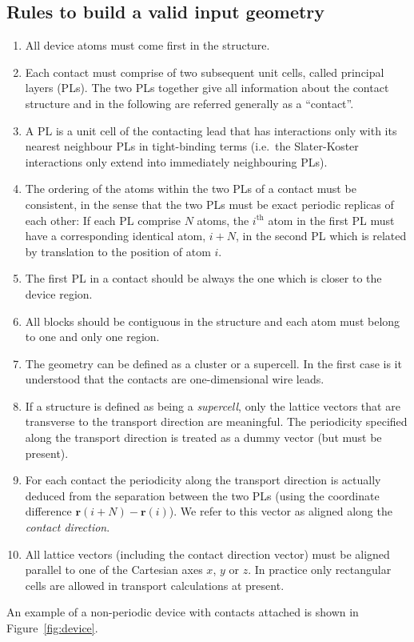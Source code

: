 \subsection{Rules to build a valid input geometry}
\begin{enumerate}
\item \label{rule1} All device atoms must come first in the structure.
\item \label{rule2} Each contact must comprise of two subsequent unit cells,
  called principal layers (PLs). The two PLs together give all information about
  the contact structure and in the following are referred generally as a
  ``contact''.
\item \label{rule3} A PL is a unit cell of the contacting lead that has
  interactions only with its nearest neighbour PLs in tight-binding terms
  (i.e.\ the Slater-Koster interactions only extend into immediately neighbouring
  PLs).
\item \label{rule4} The ordering of the atoms within the two PLs of a contact
  must be consistent, in the sense that the two PLs must be exact periodic
  replicas of each other: If each PL comprise $N$ atoms, the $i^\mathrm{th}$
  atom in the first PL must have a corresponding identical atom, $i+N$, in the
  second PL which is related by translation to the position of atom $i$.
\item \label{rule5} The first PL in a contact should be always the one which is
  closer to the device region.
\item \label{rule6} All blocks should be contiguous in the structure and each
  atom must belong to one and only one region.
\item \label{rule7} The geometry can be defined as a cluster or a supercell. In
  the first case is it understood that the contacts are one-dimensional wire
  leads.
\item \label{rule8} If a structure is defined as being a {\em supercell}, only
  the lattice vectors that are transverse to the transport direction are
  meaningful. The periodicity specified along the transport direction is treated
  as a dummy vector (but must be present).
\item \label{rule9} For each contact the periodicity along the transport
  direction is actually deduced from the separation between the two PLs (using
  the coordinate difference $\mathbf{r}(i+N)-\mathbf{r}(i)$). We refer to this
  vector as aligned along the {\em contact direction}.
\item \label{rule10} All lattice vectors (including the contact direction
  vector) must be aligned parallel to one of the Cartesian axes $x$, $y$ or
  $z$. In practice only rectangular cells are allowed in transport calculations
  at present.
\end{enumerate}
An example of a non-periodic device with contacts attached is shown in
Figure~\ref{fig:device}.

